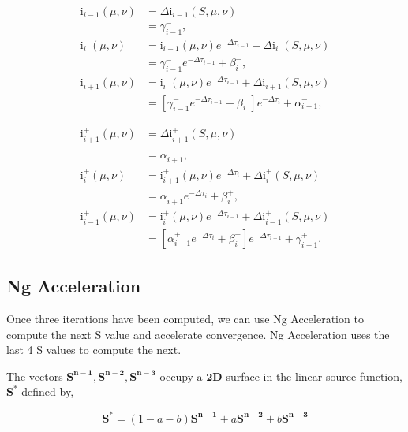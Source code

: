 \documentclass[12pt]{article}
\begin{document}
\begin{align*}
\text{i}_{i - 1}^- (\mu, \nu)
&=
\Delta\text{i}_{i - 1}^- (S, \mu, \nu)
\\ &=
\gamma_{i - 1}^-,
\\ \text{i}_{i}^- (\mu, \nu)
&=
\text{i}_{i - 1}^- (\mu, \nu) e^{-\Delta\tau_{i - 1}} +
    \Delta\text{i}_{i}^- (S, \mu, \nu)
\\ &=
\gamma_{i - 1}^- e^{-\Delta\tau_{i - 1}} + \beta_{i}^-,
\\ \text{i}_{i + 1}^- (\mu, \nu)
&=
\text{i}_{i}^- (\mu, \nu) e^{-\Delta\tau_{i - 1}} +
    \Delta\text{i}_{i + 1}^- (S, \mu, \nu)
\\ &=
[\gamma_{i - 1}^- e^{-\Delta\tau_{i - 1}} + \beta_{i}^-] e^{-\Delta\tau_{i}} +
    \alpha_{i + 1}^-,
\end{align*}

\begin{align*}
\text{i}_{i + 1}^+ (\mu, \nu)
&=
\Delta\text{i}_{i + 1}^+ (S, \mu, \nu)
\\ &=
\alpha_{i + 1}^+,
\\ \text{i}_{i}^+ (\mu, \nu)
&=
\text{i}_{i + 1}^+ (\mu, \nu) e^{-\Delta\tau_{i}} +
    \Delta\text{i}_{i}^+ (S, \mu, \nu)
\\ &=
\alpha_{i + 1}^+ e^{-\Delta\tau_{i}} + \beta_{i}^+,
\\ \text{i}_{i - 1}^+ (\mu, \nu)
&=
\text{i}_{i}^+ (\mu, \nu) e^{-\Delta\tau_{i - 1}} +
    \Delta\text{i}_{i - 1}^+ (S, \mu, \nu)
\\ &=
[\alpha_{i + 1}^+ e^{-\Delta\tau_{i}} + \beta_{i}^+] e^{-\Delta\tau_{i - 1}} +
    \gamma_{i - 1}^+.
\end{align*}

\subsection{Ng Acceleration}
Once three iterations have been computed, we can use Ng Acceleration \citep{ng_1974} to compute the next S value and accelerate convergence. Ng Acceleration uses the last 4 S values to compute the next. 

The vectors $\mathbf{S^{n-1}},  \mathbf{S^{n-2}}, \mathbf{S^{n-3}}$ occupy a $\mathbf{2D}$ surface in the linear source function, $\mathbf{S}^{*}$ defined by,

\begin{equation}
    \mathbf{S^{*}} = (1-a-b)\mathbf{S^{n-1}} + a\mathbf{S^{n-2}} + b\mathbf{S^{n-3}}
\end{equation}
\end{document}
